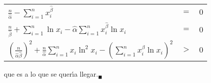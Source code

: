 \begin{solucion}
\begin{enumerate}
  \begin{center}
   \begin{tabular}{lcr}
    $\displaystyle{ \frac{n}{\hat{ \alpha} } - \sum_{i=1}^n x_i^{\hat{\beta}} }$ & $=$ & $0$ \\
    $\displaystyle{ \frac{n}{\hat{\beta}} + \sum_{i=1}^{n} \ln x_i - \hat{\alpha} \sum_{i=1}^n x_i^{\hat{\beta}} \ln x_i }$ & $=$ & $0$ \\
    $\displaystyle{ \left( \frac{n}{\hat{\alpha} \hat{\beta}} \right)^2 + \frac{n}{\hat{\alpha}} \sum_{i=1}^n x_i \ln^2 x_i - \left( \sum_{i=1}^n x_i^{\hat{\beta}} \ln x_i \right)^2 }$ & $>$ & $0$
   \end{tabular}
  \end{center}
  que es a lo que se quer\'{\i}a llegar.${}_{\blacksquare}$
 \end{enumerate}
\end{solucion}
